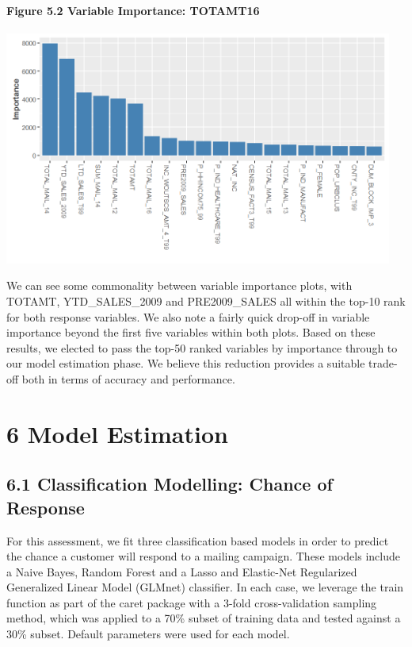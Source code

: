 \documentclass[]{article}
\let\oldparagraph\paragraph
\renewcommand{\paragraph}[1]{\oldparagraph{#1}\mbox{}}
\begin{document}
\paragraph{Figure 5.2 Variable Importance:
TOTAMT16}\label{figure-5.2-variable-importance-totamt16}

\includegraphics[height=3.02083in]{images/varimp_totamt16.png}

We can see some commonality between variable importance plots, with
TOTAMT, YTD\_SALES\_2009 and PRE2009\_SALES all within the top-10 rank
for both response variables. We also note a fairly quick drop-off in
variable importance beyond the first five variables within both plots.
Based on these results, we elected to pass the top-50 ranked variables
by importance through to our model estimation phase. We believe this
reduction provides a suitable trade-off both in terms of accuracy and
performance.

\section{6 Model Estimation}\label{model-estimation}

\subsection{6.1 Classification Modelling: Chance of
Response}\label{classification-modelling-chance-of-response}

For this assessment, we fit three classification based models in order
to predict the chance a customer will respond to a mailing campaign.
These models include a Naive Bayes, Random Forest and a Lasso and
Elastic-Net Regularized Generalized Linear Model (GLMnet) classifier. In
each case, we leverage the train function as part of the caret package
with a 3-fold cross-validation sampling method, which was applied to a
70\% subset of training data and tested against a 30\% subset. Default
parameters were used for each model.
\end{document}
